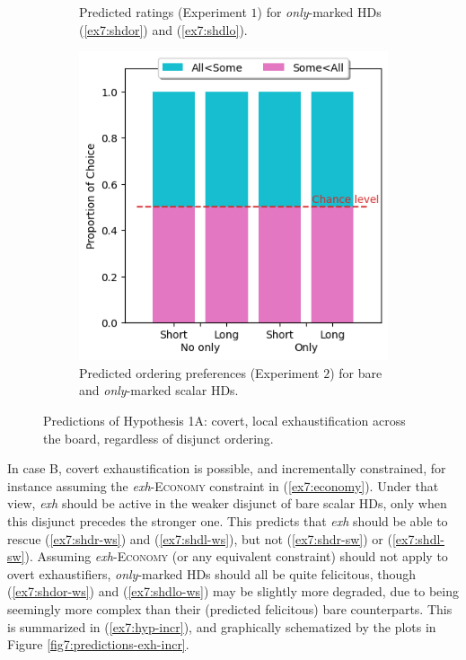 \begin{figure}[H]
\begin{subfigure}[t]{.32\linewidth}
		\caption[]{Predicted ratings (Experiment $1$) for \textit{only}-marked HDs (\ref{ex7:shdor}) and (\ref{ex7:shdlo}).}
	\end{subfigure}
	\hfill
	\begin{subfigure}[t]{.32\linewidth}
		\centering
		\includegraphics[width=\linewidth]{./images/pred-1a-pref.png}
		\caption[]{Predicted ordering preferences (Experiment $2$) for bare and \textit{only}-marked scalar HDs.}
	\end{subfigure}
	\caption[]{Predictions of Hypothesis 1A: covert, local exhaustification across the board, regardless of disjunct ordering.}\label{fig7:predictions-exh-atb}
\end{figure} 

In case B, covert exhaustification is possible, and incrementally constrained, for instance assuming the \textit{exh}-\textsc{Economy} constraint in (\ref{ex7:economy}). Under that view, \textit{exh} should be active in the weaker disjunct of bare scalar HDs, only when this disjunct precedes the stronger one. This predicts that \textit{exh} should be able to rescue (\ref{ex7:shdr-ws}) and (\ref{ex7:shdl-ws}), but not (\ref{ex7:shdr-sw}) or (\ref{ex7:shdl-sw}). Assuming \textit{exh}-\textsc{Economy} (or any equivalent constraint) should not apply to overt exhaustifiers, \textit{only}-marked HDs should all be quite felicitous, though (\ref{ex7:shdor-ws}) and (\ref{ex7:shdlo-ws}) may be slightly more degraded, due to being seemingly more complex than their (predicted felicitous) bare counterparts. This is summarized in (\ref{ex7:hyp-incr}), and graphically schematized by the plots in Figure \ref{fig7:predictions-exh-incr}.

